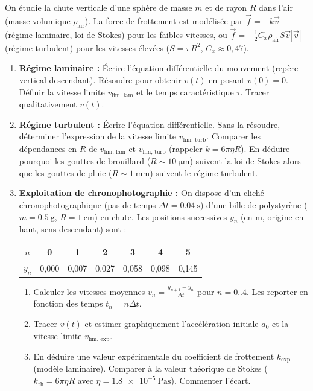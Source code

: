 \documentclass[11pt]{article}
\begin{document}
\begin{exercice}
On étudie la chute verticale d'une sphère de masse $m$ et de rayon $R$ dans l'air (masse volumique $\rho_{\text{air}}$). La force de frottement est modélisée par $\vec{f} = -k \vec{v}$ (régime laminaire, loi de Stokes) pour les faibles vitesses, ou $\vec{f} = -\frac{1}{2}C_x \rho_{\text{air}} S \vec{v}|\vec{v}|$ (régime turbulent) pour les vitesses élevées ($S = \pi R^2$, $C_x \approx 0,47$).
\begin{enumerate}
    \item \textbf{Régime laminaire :} Écrire l'équation différentielle du mouvement (repère vertical descendant). Résoudre pour obtenir $v(t)$ en posant $v(0)=0$. Définir la vitesse limite $v_{\text{lim, lam}}$ et le temps caractéristique $\tau$. Tracer qualitativement $v(t)$.
    \item \textbf{Régime turbulent :} Écrire l'équation différentielle. Sans la résoudre, déterminer l'expression de la vitesse limite $v_{\text{lim, turb}}$. Comparer les dépendances en $R$ de $v_{\text{lim, lam}}$ et $v_{\text{lim, turb}}$ (rappeler $k = 6\pi\eta R$). En déduire pourquoi les gouttes de brouillard ($R \sim \SI{10}{\micro\metre}$) suivent la loi de Stokes alors que les gouttes de pluie ($R \sim \SI{1}{\milli\metre}$) suivent le régime turbulent.
    \item \textbf{Exploitation de chronophotographie :} On dispose d'un cliché chronophotographique (pas de temps $\Delta t = \SI{0,04}{\second}$) d'une bille de polystyrène ($m = \SI{0,5}{\gram}$, $R = \SI{1}{\centi\metre}$) en chute. Les positions successives $y_n$ (en m, origine en haut, sens descendant) sont :
    \begin{center}
    \begin{tabular}{c|cccccc}
    $n$ & 0 & 1 & 2 & 3 & 4 & 5 \\
    \hline
    $y_n$ & 0,000 & 0,007 & 0,027 & 0,058 & 0,098 & 0,145
    \end{tabular}
    \end{center}
    \begin{enumerate}
        \item Calculer les vitesses moyennes $\bar{v}_n = \frac{y_{n+1}-y_n}{\Delta t}$ pour $n=0..4$. Les reporter en fonction des temps $t_n = n\Delta t$.
        \item Tracer $v(t)$ et estimer graphiquement l'accélération initiale $a_0$ et la vitesse limite $v_{\text{lim, exp}}$.
        \item En déduire une valeur expérimentale du coefficient de frottement $k_{\text{exp}}$ (modèle laminaire). Comparer à la valeur théorique de Stokes ($k_{\text{th}} = 6\pi\eta R$ avec $\eta = \SI{1,8e-5}{\pascal\second}$). Commenter l'écart.
    \end{enumerate}
\end{enumerate}
\end{exercice}
\end{document}
